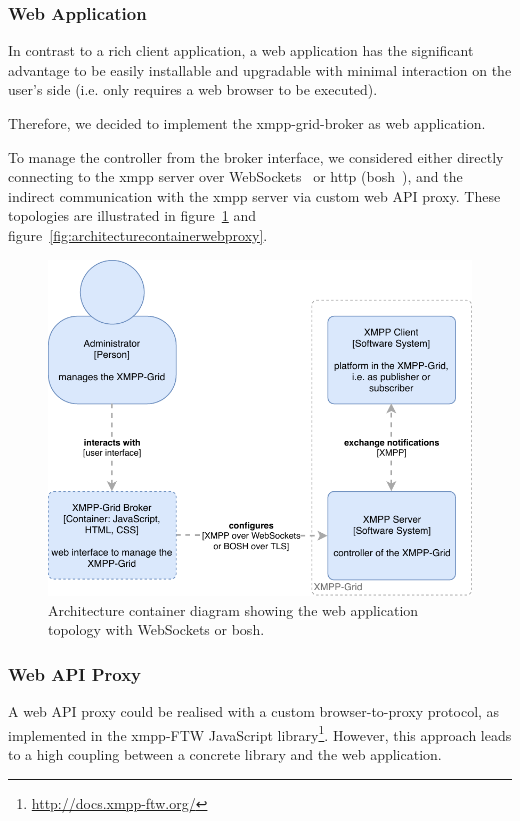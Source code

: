 \subsubsection{Web Application}

In contrast to a rich client application, a web application has the significant advantage to be easily installable and upgradable with minimal interaction on the user's side (i.e. only requires a web browser to be executed).

Therefore, we decided to implement the \gls{xmpp-grid-broker} as web application.

To manage the \gls{controller} from the \gls{broker} interface, we considered either directly connecting to the \gls{xmpp} server over WebSockets~\cite{rfc7395} or \gls{http} (\gls{bosh}~\cite{xep-0124}), and the indirect communication with the \gls{xmpp} server via custom web API proxy.
These topologies are illustrated in figure~\ref{fig:architecturecontainerwebapplication} and figure~\ref{fig:architecturecontainerwebproxy}.

\begin{figure}[h]
\centering
\includegraphics[width=0.7\linewidth]{resources/architecture_container_webapplication}
\caption[Architecture container diagram: Web application]{Architecture container diagram showing the web application topology with WebSockets or \gls{bosh}.}
\label{fig:architecturecontainerwebapplication}
\end{figure}

\subsubsection{Web API Proxy}

A web API proxy could be realised with a custom browser-to-proxy protocol, as implemented in the \gls{xmpp}-FTW JavaScript library\footnote{\url{http://docs.xmpp-ftw.org/}}.
However, this approach leads to a high coupling between a concrete library and the web application.

